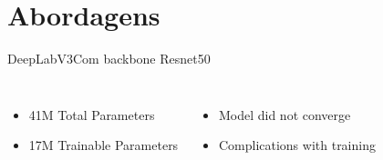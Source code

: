 \section{Abordagens}
\begin{frame}[c]{DeepLabV3}{Com backbone Resnet50}

    \begin{columns}
            \begin{itemize}
                  \item 41M Total Parameters
                  \item 17M Trainable Parameters
            \end{itemize}
            \begin{itemize}
                  \item Model did not converge
                  \item Complications with training
            \end{itemize}
    \end{columns}

    
  \end{frame}
